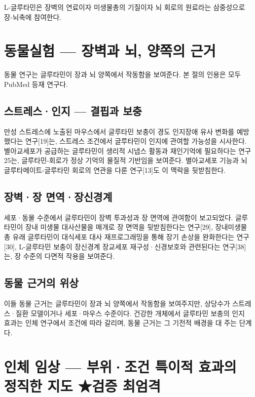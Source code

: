 \documentclass[12pt,oneside]{book}
\begin{document}
L-글루타민은 장벽의 연료이자 미생물총의 기질이자 뇌 회로의 원료라는 삼중성으로 장-뇌축에 참여한다.

\section{동물실험 — 장벽과 뇌, 양쪽의 근거}

동물 연구는 글루타민이 장과 뇌 양쪽에서 작동함을 보여준다. 본 절의 인용은 모두 PubMed 등재 연구다.

\subsection{스트레스·인지 — 결핍과 보충}

만성 스트레스에 노출된 마우스에서 글루타민 보충이 경도 인지장애 유사 변화를 예방했다는 연구[19]는, 스트레스 조건에서 글루타민이 인지에 관여할 가능성을 시사한다. 별아교세포가 공급하는 글루타민이 생리적 시냅스 활동과 재인기억에 필요하다는 연구25는, 글루타민-회로가 정상 기억의 물질적 기반임을 보여준다. 별아교세포 기능과 뇌 글루타메이트-글루타민 회로의 연관을 다룬 연구[13]도 이 맥락을 뒷받침한다.

\subsection{장벽·장 면역·장신경계}

세포·동물 수준에서 글루타민이 장벽 투과성과 장 면역에 관여함이 보고되었다. 글루타민이 장내 미생물 대사산물을 매개로 장 면역을 뒷받침한다는 연구[29], 장내미생물총 유래 글루타민이 대식세포 대사 재프로그래밍을 통해 장기 손상을 완화한다는 연구[30], L-글루타민 보충이 장신경계 장교세포 재구성·신경보호와 관련된다는 연구[38]는, 장 수준의 다면적 작용을 보여준다.

\subsection{동물 근거의 위상}

이들 동물 근거는 글루타민이 장과 뇌 양쪽에서 작동함을 보여주지만, 상당수가 스트레스·질환 모델이거나 세포·마우스 수준이다. 건강한 개체에서 글루타민 보충의 인지 효과는 인체 연구에서 조건에 따라 갈리며, 동물 근거는 그 기전적 배경을 대 주는 단계다.

\section{인체 임상 — 부위·조건 특이적 효과의 정직한 지도 ★검증 최엄격}
\end{document}
